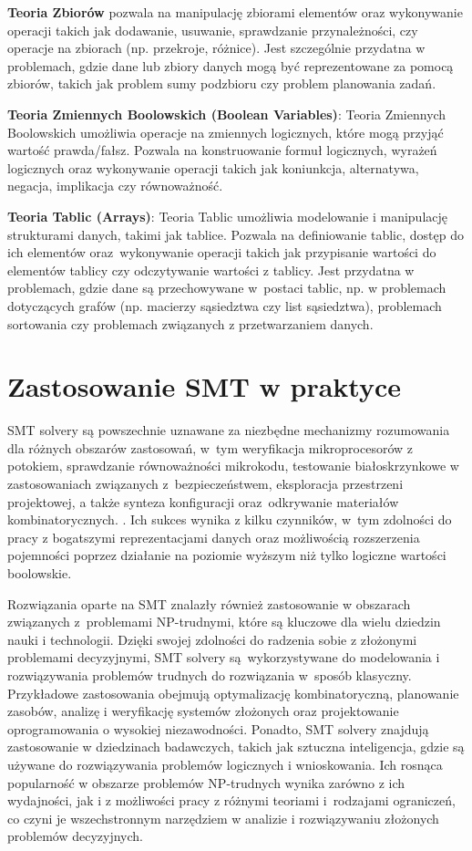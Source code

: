 \textbf{Teoria Zbiorów} pozwala na manipulację zbiorami elementów oraz wykonywanie operacji takich jak dodawanie, usuwanie, sprawdzanie przynależności, czy operacje na zbiorach (np. przekroje, różnice). Jest szczególnie przydatna w problemach, gdzie dane lub zbiory danych mogą być reprezentowane za pomocą zbiorów, takich jak problem sumy podzbioru czy problem planowania zadań.

\textbf{Teoria Zmiennych Boolowskich (Boolean Variables)}:
Teoria Zmiennych Boolowskich umożliwia operacje na zmiennych logicznych, które mogą przyjąć wartość prawda/fałsz. Pozwala na konstruowanie formuł logicznych, wyrażeń logicznych oraz wykonywanie operacji takich jak koniunkcja, alternatywa, negacja, implikacja czy równoważność. 

\textbf{Teoria Tablic (Arrays)}:
Teoria Tablic umożliwia modelowanie i manipulację strukturami danych, takimi jak tablice. Pozwala na definiowanie tablic, dostęp do ich elementów oraz~wykonywanie operacji takich jak przypisanie wartości do elementów tablicy czy odczytywanie wartości z tablicy. Jest przydatna w problemach, gdzie dane są przechowywane w~postaci tablic, np. w problemach dotyczących grafów (np. macierzy sąsiedztwa czy list sąsiedztwa), problemach sortowania czy problemach związanych z przetwarzaniem danych.

\section{Zastosowanie SMT w praktyce}
SMT solvery są powszechnie uznawane za niezbędne mechanizmy rozumowania dla różnych obszarów zastosowań, w~tym weryfikacja mikroprocesorów z potokiem, sprawdzanie równoważności mikrokodu, testowanie białoskrzynkowe w zastosowaniach związanych z~bezpieczeństwem, eksploracja przestrzeni projektowej, a także synteza konfiguracji oraz~odkrywanie materiałów kombinatorycznych. \cite{BarbosaBBKLMMMN22}. Ich sukces wynika z kilku czynników, w~tym zdolności do pracy z bogatszymi reprezentacjami danych oraz możliwością rozszerzenia pojemności poprzez działanie na poziomie wyższym niż tylko logiczne wartości boolowskie. 

Rozwiązania oparte na SMT znalazły również zastosowanie w obszarach związanych z~problemami NP-trudnymi, które są kluczowe dla wielu dziedzin nauki i technologii. Dzięki swojej zdolności do radzenia sobie z złożonymi problemami decyzyjnymi, SMT solvery są~wykorzystywane do modelowania i rozwiązywania problemów trudnych do rozwiązania w~sposób klasyczny. Przykładowe zastosowania obejmują optymalizację kombinatoryczną, planowanie zasobów, analizę i weryfikację systemów złożonych oraz projektowanie oprogramowania o wysokiej niezawodności. Ponadto, SMT solvery znajdują zastosowanie w dziedzinach badawczych, takich jak sztuczna inteligencja, gdzie są używane do rozwiązywania problemów logicznych i wnioskowania. Ich rosnąca popularność w obszarze problemów NP-trudnych wynika zarówno z ich wydajności, jak i z możliwości pracy z różnymi teoriami i~rodzajami ograniczeń, co czyni je wszechstronnym narzędziem w analizie i rozwiązywaniu złożonych problemów decyzyjnych.
